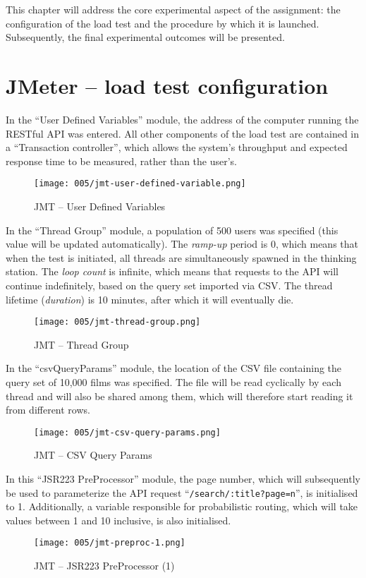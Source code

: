This chapter will address the core experimental aspect of the assignment: the configuration of the load test and the procedure by which it is launched.
Subsequently, the final experimental outcomes will be presented.

\section{JMeter – load test configuration}

In the ``User Defined Variables'' module, the address of the computer running the RESTful API was entered.
All other components of the load test are contained in a ``Transaction controller'', which allows the system's throughput and expected response time to be measured, rather than the user's.
\begin{figure}[h]
	\centering
	\texttt{[image: 005/jmt-user-defined-variable.png]}
	\caption{JMT -- User Defined Variables}
\end{figure}

\clearpage

In the ``Thread Group'' module, a population of 500 users was specified (this value will be updated automatically).
The \textit{ramp-up} period is 0, which means that when the test is initiated, all threads are simultaneously spawned in the thinking station.
The \textit{loop count} is infinite, which means that requests to the API will continue indefinitely, based on the query set imported via CSV.
The thread lifetime (\textit{duration}) is 10 minutes, after which it will eventually die.
\begin{figure}[h]
	\centering
	\texttt{[image: 005/jmt-thread-group.png]}
	\caption{JMT -- Thread Group}
\end{figure}

In the ``csvQueryParams'' module, the location of the CSV file containing the query set of 10,000 films was specified.
The file will be read cyclically by each thread and will also be shared among them, which will therefore start reading it from different rows.
\begin{figure}[h]
	\centering
	\texttt{[image: 005/jmt-csv-query-params.png]}
	\caption{JMT -- CSV Query Params}
\end{figure}

\clearpage

In this ``JSR223 PreProcessor'' module, the page number, which will subsequently be used to parameterize the API request ``\verb|/search/:title?page=n|'', is initialised to 1.
Additionally, a variable responsible for probabilistic routing, which will take values between 1 and 10 inclusive, is also initialised.
\begin{figure}[h]
	\centering
	\texttt{[image: 005/jmt-preproc-1.png]}
	\caption{JMT -- JSR223 PreProcessor (1)}
\end{figure}

